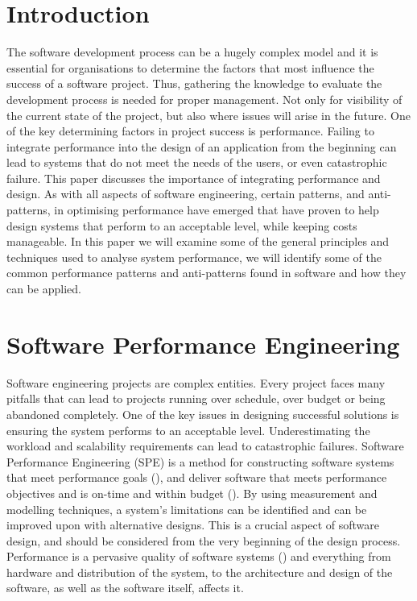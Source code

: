 \documentclass[a4paper,11pt,article,oneside]{memoir}
\begin{document}
	
	\tableofcontents
	\chapter{Introduction}
	The software development process can be a hugely complex model and it is essential for organisations to determine the factors that most influence the success of a software project. Thus, gathering the knowledge to evaluate the development process is needed for proper management. Not only for visibility of the current state of the project, but also where issues will arise in the future. One of the key determining factors in project success is performance. Failing to integrate performance into the design of an application from the beginning can lead to systems that do not meet the needs of the users, or even catastrophic failure. This paper discusses the importance of integrating performance and design. As with all aspects of software engineering, certain patterns, and anti-patterns, in optimising performance have emerged that have proven to help design systems that perform to an acceptable level, while keeping costs manageable. In this paper we will examine some of the general principles and techniques used to analyse system performance, we will identify some of the common performance patterns and anti-patterns found in software and how they can be applied.  
	
	
	\newpage
	\chapter{Software Performance Engineering}
	
	
	Software engineering projects are complex entities. Every project faces many pitfalls that can lead to projects running over schedule, over budget or being abandoned completely. One of the key issues in designing successful solutions is ensuring the system performs to an acceptable level. Underestimating the workload and scalability requirements can lead to catastrophic failures. Software Performance Engineering (SPE) is a method for constructing software systems that meet performance goals (\cite{smith1990performance}),  and deliver software that meets performance objectives and is on-time and within budget (\cite{smith2003best}).  By using measurement and modelling techniques, a system’s limitations can be identified and can be improved upon with alternative designs. This is a crucial aspect of software design, and should be considered from the very beginning of the design process. Performance is a pervasive quality of software systems (\cite{woodside2007future}) and everything from hardware and distribution of the system, to the architecture and design of the software, as well as the software itself, affects it. 
	
\end{document}
